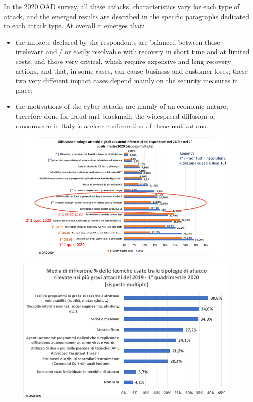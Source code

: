 \documentclass{easychair}
\begin{document}
In the 2020 OAD survey, all these attacks’ characteristics vary for each type of attack, and the emerged results are described in the specific paragraphs dedicated to each attack 
type. At overall it emerges that:
\begin{itemize}
\item the impacts declared by the respondents are balanced between those irrelevant and / or easily resolvable with recovery in short time and at limited costs, and those very 
critical, which require expensive and long recovery actions, and that, in some cases, can cause business and customer loses; these two very different impact cases depend mainly 
on the security measures in place;

\item the motivations of the cyber attacks are mainly of an economic nature, therefore done for fraud and blackmail: the widespread diffusion of ransomware in Italy is a clear 
confirmation of these motivations.
\end{itemize}


\begin{figure}
	\centering
		\includegraphics[width=1\textwidth]{pictures/fig5.png}
		\caption{}
		\label{fig:5}
\end{figure}
\begin{figure}
	\centering
		\includegraphics[width=1\textwidth]{pictures/fig6.png}
		\caption{}
		\label{fig:6}
\end{figure}
\end{document}
